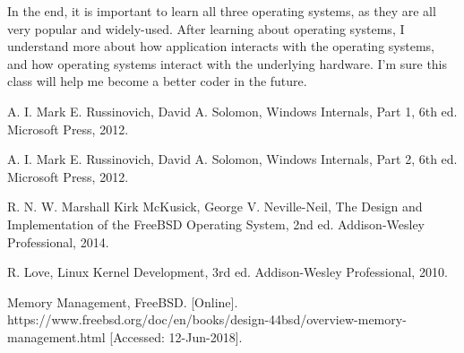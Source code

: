 \documentclass[10pt,a4paper]{article}
\begin{document}
In the end, it is important to learn all three operating systems, as they are all very popular and widely-used. After learning about operating systems, I understand more about how application interacts with the operating systems, and how operating systems interact with the underlying hardware. I’m sure this class will help me become a better coder in the future.



\begin{thebibliography}{10}
A. I. Mark E. Russinovich, David A. Solomon, Windows Internals, Part 1, 6th ed. Microsoft Press, 2012.

A. I. Mark E. Russinovich, David A. Solomon, Windows Internals, Part 2, 6th ed. Microsoft Press, 2012.

R. N. W. Marshall Kirk McKusick, George V. Neville-Neil, The Design and Implementation of the FreeBSD Operating System, 2nd ed.
Addison-Wesley Professional, 2014.

R. Love, Linux Kernel Development, 3rd ed. Addison-Wesley Professional, 2010.

Memory Management, FreeBSD. [Online]. https://www.freebsd.org/doc/en/books/design-44bsd/overview-memory-management.html [Accessed: 12-Jun-2018].


\end{thebibliography}
\end{document}
